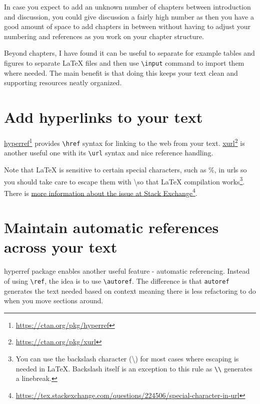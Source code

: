 In case you expect to add an unknown number of chapters between introduction and discussion, you could give discussion a fairly high number as then you have a good amount of space to add chapters in between without having to adjust your numbering and references as you work on your chapter structure.

Beyond chapters, I have found it can be useful to separate for example tables and figures to separate LaTeX files and then use \texttt{\textbackslash input} command to import them where needed.
The main benefit is that doing this keeps your text clean and supporting resources neatly organized.

\section{Add hyperlinks to your text}

\href{https://ctan.org/pkg/hyperref}{hyperref}\footnote{\url{https://ctan.org/pkg/hyperref}} provides \texttt{\textbackslash href} syntax for linking to the web from your text. \href{https://ctan.org/pkg/xurl}{xurl}\footnote{\url{https://ctan.org/pkg/xurl}} is another useful one with its \texttt{\textbackslash url} syntax and nice reference handling.

Note that LaTeX is sensitive to certain special characters, such as \%, in urls so you should take care to escape them with \textbackslash so that LaTeX compilation works\footnote{You can use the backslash character (\textbackslash) for most cases where escaping is needed in LaTeX. Backslash itself is an exception to this rule as \texttt{\textbackslash\textbackslash} generates a linebreak.}.
There is \href{https://tex.stackexchange.com/questions/224506/special-character-in-url}{more information about the issue at Stack Exchange}\footnote{\url{https://tex.stackexchange.com/questions/224506/special-character-in-url}}.

\section{Maintain automatic references across your text}

hyperref package enables another useful feature - automatic referencing. Instead of using \texttt{\textbackslash ref}, the idea is to use \texttt{\textbackslash autoref}.
The difference is that \texttt{autoref} generates the text needed based on context meaning there is less refactoring to do when you move sections around.


